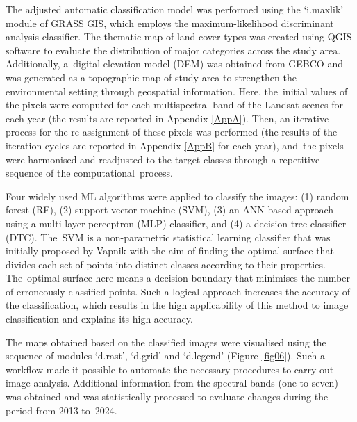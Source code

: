 \documentclass[jmse,article,accept,pdftex,oneauthor]{Definitions/mdpi}
\begin{document}
The adjusted automatic classification model was performed using the `i.maxlik' module of GRASS GIS, which employs the maximum-likelihood discriminant analysis classifier. {The thematic map of land cover types was created using QGIS software to evaluate the distribution of major categories across the study area. Additionally, a~digital elevation model (DEM) was obtained from GEBCO and was generated as a topographic map of study area to strengthen the environmental setting through geospatial information. }Here, the~initial values of the pixels were computed for each multispectral band of the Landsat scenes for each year (the results are reported in Appendix \ref{AppA}). Then, an iterative process for the re-assignment of these pixels was performed (the results of the iteration cycles are reported in Appendix \ref{AppB} for each year), and~the pixels were harmonised and readjusted to the target classes through a repetitive sequence of the computational~process. 

{Four widely used ML algorithms were applied to classify the images: (1) random forest (RF), (2) support vector machine (SVM), (3) an ANN-based approach using a multi-layer perceptron (MLP) classifier, and (4) a decision tree classifier (DTC). The~SVM is a non-parametric statistical learning classifier  that was initially proposed by Vapnik} \cite{788640} {with the aim of finding the optimal surface that divides each set of points into distinct classes according to their properties. The~optimal surface here means a decision boundary that minimises the number of erroneously classified points. Such a logical approach increases the accuracy of the classification, which results in the high applicability of this method to image classification and explains its high accuracy.}

{The} maps obtained based on the classified images were visualised using the sequence of modules `d.rast', `d.grid' and `d.legend' {(}Figure \ref{fig06}{)}.  Such a workflow made it possible to automate the necessary procedures to carry out image analysis. Additional information from the spectral bands (one to seven)  was obtained and was statistically processed to evaluate changes during the period from 2013 to~2024. 
\end{document}
